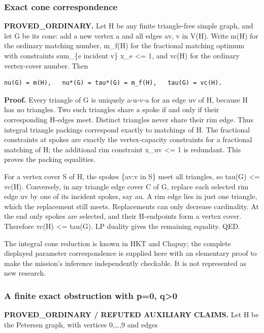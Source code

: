 \documentclass[11pt]{article}
\begin{document}
\subsubsection{Exact cone correspondence}\label{exact-cone-correspondence}

\textbf{PROVED\_ORDINARY.} Let H be any finite triangle-free simple graph, and let G be its cone: add a new vertex a and all edges av, v in V(H). Write m(H) for the ordinary matching number, m\_f(H) for the fractional matching optimum with constraints sum\_\{e incident v\} x\_e \textless= 1, and vc(H) for the ordinary vertex-cover number. Then

\begin{verbatim}
nu(G) = m(H),   nu*(G) = tau*(G) = m_f(H),   tau(G) = vc(H).
\end{verbatim}

\textbf{Proof.} Every triangle of G is uniquely a-u-v-a for an edge uv of H, because H has no triangles. Two such triangles share a spoke if and only if their corresponding H-edges meet. Distinct triangles never share their rim edge. Thus integral triangle packings correspond exactly to matchings of H. The fractional constraints at spokes are exactly the vertex-capacity constraints for a fractional matching of H; the additional rim constraint x\_uv \textless= 1 is redundant. This proves the packing equalities.

For a vertex cover S of H, the spokes \{av:v in S\} meet all triangles, so tau(G) \textless= vc(H). Conversely, in any triangle edge cover C of G, replace each selected rim edge uv by one of its incident spokes, say au. A rim edge lies in just one triangle, which the replacement still meets. Replacements can only decrease cardinality. At the end only spokes are selected, and their H-endpoints form a vertex cover. Therefore vc(H) \textless= tau(G). LP duality gives the remaining equality. QED.

The integral cone reduction is known in HKT and Chapuy; the complete displayed parameter correspondence is supplied here with an elementary proof to make the mission's inference independently checkable. It is not represented as new research.

\subsubsection{A finite exact obstruction with p=0, q\textgreater0}\label{a-finite-exact-obstruction-with-p0-q0}

\textbf{PROVED\_ORDINARY / REFUTED AUXILIARY CLAIMS.} Let H be the Petersen graph, with vertices 0,\ldots,9 and edges
\end{document}
